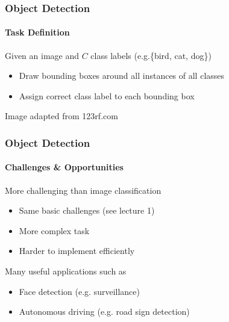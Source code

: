 \documentclass[xetex,professionalfont]{beamer}
\newcommand{\eg}{\mbox{e.g.}\xspace} %
\begin{document}
\begin{frame}
	\frametitle{Object Detection}
	\framesubtitle{Task Definition}

	Given an image and $C$ class labels (\eg \{bird, cat, dog\})
	\begin{itemize}
		\item Draw bounding boxes around all instances of all classes
		\item Assign correct class label to each bounding box
	\end{itemize}

	\smallskip

	\begin{center}
		{\centering Image adapted from 123rf.com}
	\end{center}

\end{frame}


\begin{frame}
	\frametitle{Object Detection}
	\framesubtitle{Challenges \& Opportunities}

	More challenging than image classification
	\begin{itemize}
		\item Same basic challenges (see lecture 1)
		\item More complex task
		\item Harder to implement efficiently
	\end{itemize}

	\bigskip

	Many useful applications such as
	\begin{itemize}
		\item Face detection (\eg surveillance)
		\item Autonomous driving (\eg road sign detection)
	\end{itemize}

\end{frame}
\end{document}
